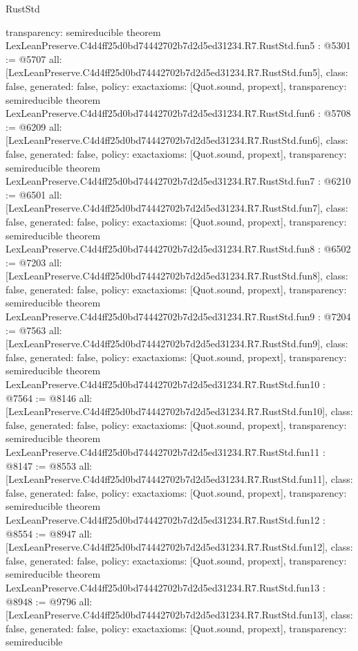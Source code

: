 \begin{lexlean}{RustStd}
\begin{coremodule}
{  transparency: semireducible
}
theorem LexLeanPreserve.C4d4ff25d0bd74442702b7d2d5ed31234.R7.RustStd.fun5 : @5301 := @5707 {
  all: [LexLeanPreserve.C4d4ff25d0bd74442702b7d2d5ed31234.R7.RustStd.fun5],
  class: false,
  generated: false,
  policy: exact{axioms: [Quot.sound, propext]},
  transparency: semireducible
}
theorem LexLeanPreserve.C4d4ff25d0bd74442702b7d2d5ed31234.R7.RustStd.fun6 : @5708 := @6209 {
  all: [LexLeanPreserve.C4d4ff25d0bd74442702b7d2d5ed31234.R7.RustStd.fun6],
  class: false,
  generated: false,
  policy: exact{axioms: [Quot.sound, propext]},
  transparency: semireducible
}
theorem LexLeanPreserve.C4d4ff25d0bd74442702b7d2d5ed31234.R7.RustStd.fun7 : @6210 := @6501 {
  all: [LexLeanPreserve.C4d4ff25d0bd74442702b7d2d5ed31234.R7.RustStd.fun7],
  class: false,
  generated: false,
  policy: exact{axioms: [Quot.sound, propext]},
  transparency: semireducible
}
theorem LexLeanPreserve.C4d4ff25d0bd74442702b7d2d5ed31234.R7.RustStd.fun8 : @6502 := @7203 {
  all: [LexLeanPreserve.C4d4ff25d0bd74442702b7d2d5ed31234.R7.RustStd.fun8],
  class: false,
  generated: false,
  policy: exact{axioms: [Quot.sound, propext]},
  transparency: semireducible
}
theorem LexLeanPreserve.C4d4ff25d0bd74442702b7d2d5ed31234.R7.RustStd.fun9 : @7204 := @7563 {
  all: [LexLeanPreserve.C4d4ff25d0bd74442702b7d2d5ed31234.R7.RustStd.fun9],
  class: false,
  generated: false,
  policy: exact{axioms: [Quot.sound, propext]},
  transparency: semireducible
}
theorem LexLeanPreserve.C4d4ff25d0bd74442702b7d2d5ed31234.R7.RustStd.fun10 : @7564 := @8146 {
  all: [LexLeanPreserve.C4d4ff25d0bd74442702b7d2d5ed31234.R7.RustStd.fun10],
  class: false,
  generated: false,
  policy: exact{axioms: [Quot.sound, propext]},
  transparency: semireducible
}
theorem LexLeanPreserve.C4d4ff25d0bd74442702b7d2d5ed31234.R7.RustStd.fun11 : @8147 := @8553 {
  all: [LexLeanPreserve.C4d4ff25d0bd74442702b7d2d5ed31234.R7.RustStd.fun11],
  class: false,
  generated: false,
  policy: exact{axioms: [Quot.sound, propext]},
  transparency: semireducible
}
theorem LexLeanPreserve.C4d4ff25d0bd74442702b7d2d5ed31234.R7.RustStd.fun12 : @8554 := @8947 {
  all: [LexLeanPreserve.C4d4ff25d0bd74442702b7d2d5ed31234.R7.RustStd.fun12],
  class: false,
  generated: false,
  policy: exact{axioms: [Quot.sound, propext]},
  transparency: semireducible
}
theorem LexLeanPreserve.C4d4ff25d0bd74442702b7d2d5ed31234.R7.RustStd.fun13 : @8948 := @9796 {
  all: [LexLeanPreserve.C4d4ff25d0bd74442702b7d2d5ed31234.R7.RustStd.fun13],
  class: false,
  generated: false,
  policy: exact{axioms: [Quot.sound, propext]},
  transparency: semireducible
}
\end{coremodule}
\end{lexlean}
